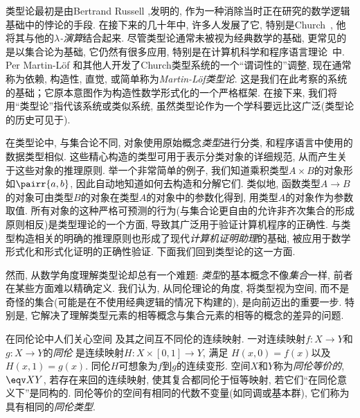 类型论最初是由Bertrand Russell \cite{Russell:1908},发明的, 作为一种消除当时正在研究的数学逻辑基础中的悖论的手段. 
在接下来的几十年中, 许多人发展了它, 特别是Church~\cite{Church:1940tu,Church:1941tc}, 他将其与他的\textit{$\lambda$-演算}结合起来. 
尽管类型论通常未被视为经典数学的基础, 更常见的是以集合论为基础, 它仍然有很多应用, 特别是在计算机科学和程序语言理论~\cite{Pierce-TAPL}中. 
%
%
%
Per Martin-L\"{o}f \cite{Martin-Lof-1972,Martin-Lof-1973,Martin-Lof-1979,martin-lof:bibliopolis}和其他人开发了Church类型系统的一个``谓词性的''调整, 现在通常称为依赖, 构造性, 直觉, 或简单称为\emph{Martin\--L\"of类型论}. 这是我们在此考察的系统的基础；它原本意图作为构造性数学形式化的一个严格框架. 在接下来, 我们将用``类型论''指代该系统或类似系统, 虽然类型论作为一个学科要远比这广泛(类型论的历史可见于\cite{somma,kamar}). 

在类型论中, 与集合论不同, 对象使用原始概念\emph{类型}进行分类, 和程序语言中使用的数据类型相似.  这些精心构造的类型可用于表示分类对象的详细规范, 从而产生关于这些对象的推理原则.  举一个非常简单的例子, 我们知道乘积类型$A\times B$的对象形如$\pairr{a,b}$, 因此自动地知道如何去构造和分解它们.  类似地, 函数类型$A\to B$的对象可由类型$B$的对象在类型$A$的对象中的参数化得到, 用类型$A$的对象作为参数取值.  所有对象的这种严格可预测的行为(与集合论更自由的允许非齐次集合的形成原则相反)是类型理论的一个方面, 导致其广泛用于验证计算机程序的正确性.   与类型构造相关的明确的推理原则也形成了现代\emph{计算机证明助理}的基础, %
%
%
被应用于数学形式化和形式化证明的正确性验证.  下面我们回到类型论的这一方面. 

然而, 从数学角度理解类型论却总有一个难题: \emph{类型}的基本概念不像\emph{集合}一样, 前者在某些方面难以精确定义.  我们认为, 从同伦理论的角度, 将类型视为空间, 而不是奇怪的集合(可能是在不使用经典逻辑的情况下构建的), 是向前迈出的重要一步. 特别是, 它解决了理解类型元素的相等概念与集合元素的相等的概念的差异的问题. 

在同伦论中人们关心空间
%
及其之间互不同伦的连续映射. 
%
一对连续映射$f : X \to Y$和$g : X\to Y$的\emph{同伦}
%
是连续映射$H : X \times [0, 1] \to Y$, 满足
$H(x, 0) = f (x)$以及$H(x, 1) = g(x)$. 同伦$H$可想象为$f$到$g$的连续变形.  空间$X$和$Y$称为\emph{同伦等价的}, 
%
$\eqv X Y$, 若存在来回的连续映射, 使其复合都同伦于恒等映射, 若它们``在同伦意义下''是同构的.  同伦等价的空间有相同的代数不变量(如同调或基本群), 它们称为具有相同的\emph{同伦类型}. 

